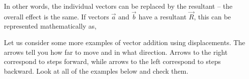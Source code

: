         \label{m38813*id188374}In other words, the individual vectors can be replaced by the
resultant -- the overall effect is the same. If vectors \begin{math}\stackrel{\to }{a}\end{math} and \begin{math}\stackrel{\to }{b}\end{math} have a resultant \begin{math}\stackrel{\to }{R}\end{math}, this can be represented mathematically as,\par 
        \label{m38813*id188427}\nopagebreak\noindent{}
    
        
        \label{m38813*id188482}Let us consider some more examples of vector addition using displacements. The arrows tell you how far to move and in what
direction. Arrows to the right correspond to steps forward, while
arrows to the left correspond to steps backward. Look at all of the
examples below and check them.\par 
        \label{m38813*id186651}
          
